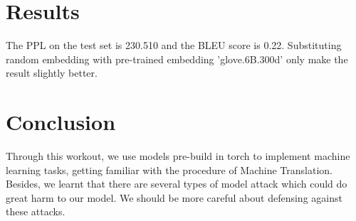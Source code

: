 \documentclass{article}
\begin{document}
\section{Results}
The PPL on the test set is 230.510 and the BLEU score is 0.22.  Substituting random embedding with pre-trained embedding 'glove.6B.300d' only make the result slightly better.


\section{Conclusion}
Through this workout, we use models pre-build in torch to implement machine learning tasks, getting familiar with the procedure of Machine Translation. Besides, we learnt that there are several types of model attack which could do great harm to our model. We should be more careful about defensing against these attacks.


\end{document}
